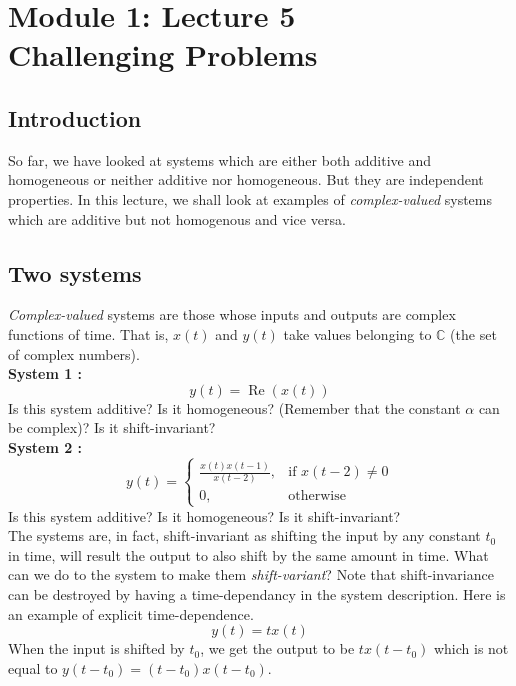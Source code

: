 \section{Module 1: Lecture 5\\ Challenging Problems}


\subsection{Introduction}
So far, we have looked at systems which are either both additive and homogeneous or neither additive nor homogeneous. But they are independent properties. In this lecture, we shall look at examples of \textit{complex-valued} systems which are additive but not homogenous and vice versa. 

\subsection{Two systems}
\textit{Complex-valued} systems are those whose inputs and outputs are complex functions of time. That is, $x(t)$ and $y(t)$ take values belonging to $\mathbb{C}$ (the set of complex numbers). 
\\

{\bf System 1 :}
\begin{equation}
y(t) = \operatorname{Re}(x(t)) \nonumber
\end{equation} 
Is this system additive? Is it homogeneous? (Remember that the constant $\alpha$ can be complex)? Is it shift-invariant? 
\\

{\bf System 2 :}
\[
    y(t)= 
\begin{cases}
    \frac{x(t)x(t-1)}{x(t-2)},& \text{if } x(t-2) \neq 0\\
    0,              & \text{otherwise}
\end{cases}
\]
Is this system additive? Is it homogeneous? Is it shift-invariant? 
\\

The systems are, in fact, shift-invariant as shifting the input by any constant $t_{0}$ in time, will result the output to also shift by the same amount in time. What can we do to the system to make them \textit{shift-variant}? Note that shift-invariance can be destroyed by having a time-dependancy in the system description. Here is an example of explicit time-dependence. 
\begin{equation}
y(t) = tx(t) \nonumber
\end{equation} When the input is shifted by $t_{0}$, we get the output to be $tx(t-t_{0})$ which is not equal to $y(t-t_{0}) = (t-t_{0})x(t - t_{0})$. 
\\

